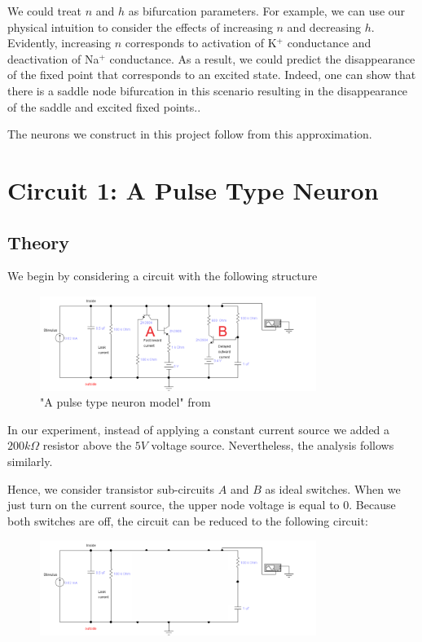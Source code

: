 \documentclass[12]{book}
\newcommand\0{\mathbf{0}}
\newcommand\<{\langle}
\renewcommand\>{\rangle}
\begin{document}
We could treat $n$ and $h$ as bifurcation parameters. For example, we can use our physical intuition to consider the effects of increasing $n$ and decreasing $h$. Evidently, increasing $n$ corresponds to activation of K$^+$ conductance and deactivation of Na$^+$ conductance. As a result, we could predict the disappearance of the fixed point that corresponds to an excited state. Indeed, one can show that there is a saddle node bifurcation in this scenario resulting in the disappearance of the saddle and excited fixed points.\cite{keener}.

The neurons we construct in this project follow from this approximation.

\section{Circuit 1: A Pulse Type Neuron}
\label{sec:pulse-neuron}

\subsection{Theory}
 
 We begin by considering a circuit with the following structure
 
\begin{figure}[H]
\label{fig:maeda-pulse}
\centering
\includegraphics[width=0.8\textwidth]{exercise1-0}
\caption{"A pulse type neuron model" from \cite{maeda2000pulse}}
\end{figure}

In our experiment, instead of applying a constant current source we added a $200k\Omega$ resistor above the $5V$ voltage source. Nevertheless, the analysis follows similarly.

Hence, we consider transistor sub-circuits $A$ and $B$ as ideal switches. When we just turn on the current source, the upper node voltage is equal to 0. Because both switches are off, the circuit can be reduced to the following circuit:
 
\begin{figure}[H]
\centering
\includegraphics[width=0.8\textwidth]{exercise1-1}
\end{figure}
\end{document}
